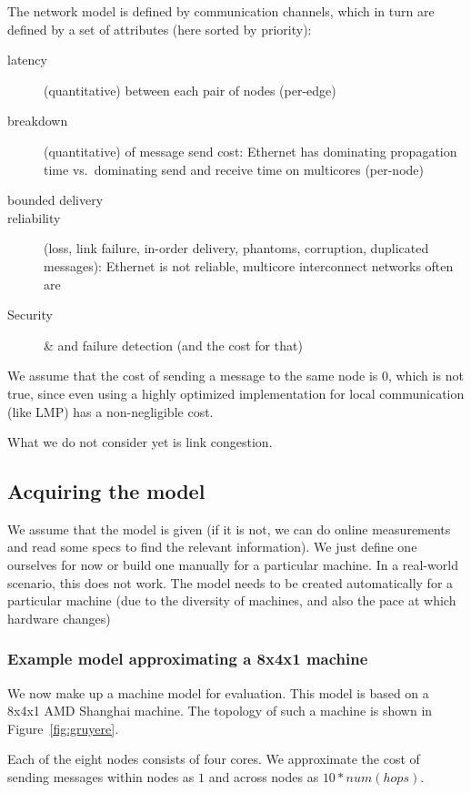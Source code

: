 \documentclass{article}
\begin{document}
The network model is defined by communication channels, which in turn
are defined by a set of attributes (here sorted by priority):

\begin{description}
\item[latency] (quantitative) between each pair of nodes (per-edge)
\item[breakdown] (quantitative) of message send cost: Ethernet has
  dominating propagation time vs.\ dominating send and receive time on
  multicores (per-node)
\item[bounded delivery]
\item[reliability] (loss, link failure, in-order delivery, phantoms,
  corruption, duplicated messages): Ethernet is not reliable,
  multicore interconnect networks often are
\item[Security] \& and failure detection (and the cost for that)
\end{description}

We assume that the cost of sending a message to the same node is 0,
which is not true, since even using a highly optimized implementation
for local communication (like LMP) has a non-negligible cost.

What we do not consider yet is link congestion. 

\subsection{Acquiring the model}

We assume that the model is given (if it is not, we can do online
measurements and read some specs to find the relevant information). We
just define one ourselves for now or build one manually for a
particular machine. In a real-world scenario, this does not work. The
model needs to be created automatically for a particular machine (due
to the diversity of machines, and also the pace at which hardware changes)

\subsubsection{Example model approximating a 8x4x1 machine}

We now make up a machine model for evaluation. This model is based on
a 8x4x1 AMD Shanghai machine. The topology of such a machine is shown
in Figure~\ref{fig:gruyere}.

Each of the eight nodes consists of four cores. We approximate the
cost of sending messages within nodes as $1$ and across nodes as
$10*num(hops)$. 
\end{document}
